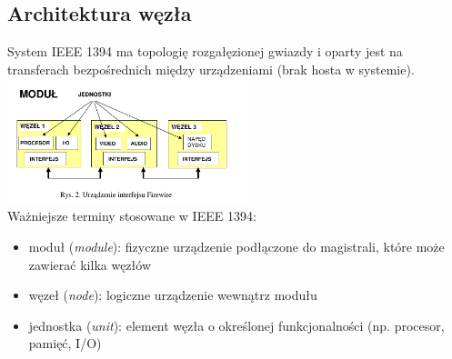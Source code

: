 \subsection{Architektura węzła}
System IEEE 1394 ma topologię rozgałęzionej gwiazdy i oparty jest na transferach bezpośrednich między urządzeniami (brak hosta w systemie).
\includegraphics[width=7cm]{./wyklady/FIREWIRE_3_1.pdf}\\
Ważniejsze terminy stosowane w IEEE 1394:
\begin{itemize}
	\item moduł (\emph{module}): fizyczne urządzenie podłączone do magistrali, które może zawierać kilka węzłów
	\item węzeł (\emph{node}): logiczne urządzenie wewnątrz modułu
	\item jednostka (\emph{unit}): element węzła o określonej funkcjonalności (np. procesor, pamięć, I/O)
\end{itemize}

